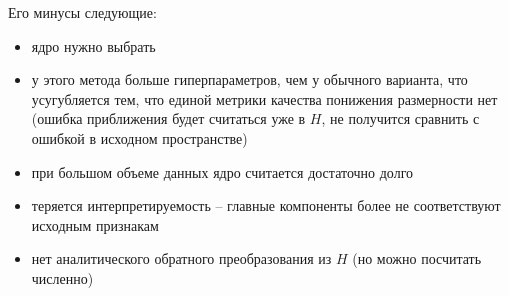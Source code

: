 \documentclass[12pt,fleqn]{article}
\begin{document}
Его минусы следующие:
\begin{itemize}
    \item ядро нужно выбрать
    \item у этого метода больше гиперпараметров, чем у обычного варианта, что усугубляется тем, что единой метрики качества понижения размерности нет (ошибка приближения будет считаться уже в $H$, не получится сравнить с ошибкой в исходном пространстве)
    \item при большом объеме данных ядро считается достаточно долго
    \item теряется интерпретируемость -- главные компоненты более не соответствуют исходным признакам
    \item нет аналитического обратного преобразования из $H$ (но можно посчитать численно)
\end{itemize}
\end{document}

